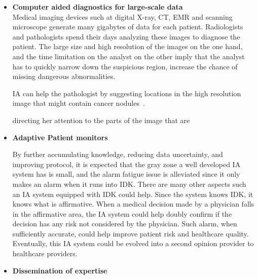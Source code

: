\documentclass[11pt]{pnas-new}
\begin{document}
\begin{itemize}
\item{\bf Computer aided diagnostics for large-scale data}\\
  Medical imaging devices such at digital X-ray, CT, EMR and scanning
  microscope generate many gigabytes of data for each
  patient. Radiologists and pathologists spend their days analyzing
  these images to diagnose the patient. The large size and high
  resolution of the images on the one hand, and the time limitation on
  the analyst on the other imply that the analyst has to quickly
  narrow down the suspicious region, increase the chance of missing
  dangerous abnormalities.

  IA can help the pathologist by suggesting locations in the high
  resolution image that might contain cancer nodules~\cite{}.

  directing her attention to the
  parts of the image that are 

\item{\bf Adaptive Patient monitors}

{\color{blue} By further accumulating knowledge, reducing data uncertainty, and improving protocol, it is expected that the gray zone a well developed IA system has is small, and the alarm fatigue issue is alleviated since it only makes an alarm when it runs into IDK. There are many other aspects such an IA system equipped with IDK could help. Since the system knows IDK, it knows what is affirmative. When a medical decision made by a physician falls in the affirmative area, the IA system could help doubly confirm if the decision has any risk not considered by the physician. Such alarm, when sufficiently accurate, could help improve patient risk and healthcare quality. Eventually, this IA system could be evolved into a second opinion provider to healthcare providers. 
}

\item {\bf Dissemination of expertise}


\end{itemize}
\end{document}
